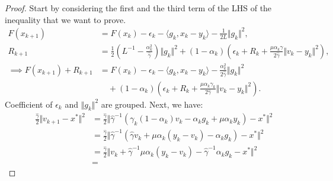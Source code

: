 \documentclass[12pt]{article}
\begin{document}
    \begin{proof}
        Start by considering the first and the third term of the LHS of the inequality that we want to prove. 
        \begin{align*}
            F(x_{k + 1}) &= 
            F(x_k) - \epsilon_k - \langle  g_k, x_k - y_k\rangle - \frac{1}{2L}\Vert g_k\Vert^2, 
            \\
            R_{k + 1}
            &= 
            \frac{1}{2}\left(
                L^{-1} - \frac{\alpha_k^2}{\hat \gamma}
            \right)\Vert g_k\Vert^2
            + 
            (1 - \alpha_k)
            \left(
                \epsilon_k + R_k + 
                \frac{\mu\alpha_k\gamma}{2\hat \gamma}
                \Vert v_k - y_k\Vert^2
            \right), 
            \\
            \implies 
            F(x_{k + 1}) + R_{k + 1}
            &= 
            F(x_k) - \epsilon_k - \langle  g_k, x_k - y_k\rangle
            - \frac{\alpha_k^2}{2\hat \gamma}\Vert g_k\Vert^2
            \\
            &\quad 
                + 
                (1 - \alpha_k)
                \left(
                    \epsilon_k + R_k + 
                    \frac{\mu\alpha_k\gamma_k}{2\hat \gamma}
                    \Vert v_k - y_k\Vert^2
                \right). 
        \tag{1*}
        \end{align*}
        Coefficient of $\epsilon_k$ and $\Vert g_k\Vert^2$ are grouped. 
        Next, we have: 
        \begin{align*}
            \frac{\hat \gamma}{2}\Vert v_{k + 1} - x^* \Vert^2
            &= 
            \frac{\hat \gamma}{2}\Vert 
                \hat \gamma^{-1}
                (
                    \gamma_k(1 - \alpha_k)v_k - 
                    \alpha_k g_k + \mu \alpha_k y_k
                )
                - x^* 
            \Vert^2
            \\
            &=  
            \frac{\hat \gamma}{2}
            \Vert 
                \hat \gamma^{-1}
                (
                \hat \gamma v_k + \mu \alpha_k(y_k - v_k)
                    - \alpha_k g_k
                )
                - x^* 
            \Vert^2
            \\
            &= 
            \frac{\hat \gamma}{2}
            \Vert 
                v_k + \hat \gamma^{-1} \mu \alpha_k (y_k - v_k)
                - \hat \gamma^{-1}\alpha_k g_k
                - x^* 
            \Vert^2
            \\
            &= 

\end{align*}
\end{proof}
\end{document}
